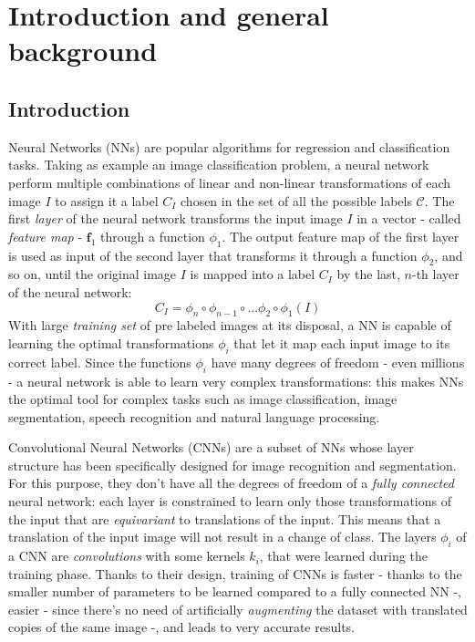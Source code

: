 

\setcounter{page}{1}



\section {Introduction and general background} 

\subsection{Introduction}

Neural Networks (NNs) are popular algorithms for regression and classification tasks. Taking as example an image classification problem, a neural network perform multiple combinations of linear and non-linear transformations of each image $I$ to assign it a label $C_I$ chosen in the set of all the possible labels $\mathcal C$. The first \textit{layer} of the neural network transforms the input image $I$ in a vector - called \textit{feature map} - $\mathbf f_1$ through a function $\phi_1$.  The output feature map of the first layer is used as input of the second layer that transforms it through a function $\phi_2$, and so on, until the original image $I$ is mapped into a label $C_I$ by the last, $n$-th layer of the neural network:
$$C_I = \phi_n \circ \phi_{n-1}\circ ... \phi_2\circ\phi_1 (I)$$
 With large \textit{training set} of pre labeled images at its disposal, a NN is capable of learning the optimal transformations $\phi_i$ that let it map each input image to its correct label. Since the functions $\phi_i$ have many degrees of freedom - even millions - a neural network is able to learn very complex transformations: this makes NNs the optimal tool for complex tasks such as image classification, image segmentation, speech recognition and natural language processing.
 
Convolutional Neural Networks (CNNs) are a subset of NNs whose layer structure has been specifically designed for image recognition and segmentation. For this purpose, they don't have all the degrees of freedom of a \textit{fully connected} neural network: each layer is constrained to learn only those transformations of the input that are \textit{equivariant} to translations of the input. This means that a translation of the input image will not result in a change of class. The layers $\phi_i$ of a CNN are \textit{convolutions} with some kernels $k_i$, that were learned during the training phase. Thanks to their design, training of CNNs is faster - thanks to the smaller number of parameters to be learned compared to a fully connected NN -, easier - since there's no need of artificially \textit{augmenting} the dataset with translated copies of the same image -, and leads to very accurate results.

